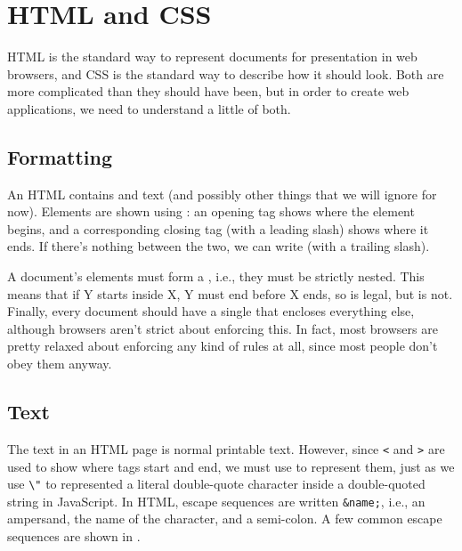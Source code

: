 \chapter{HTML and CSS}\label{s:htmlcss}

HTML is the standard way to represent documents for presentation in web browsers,
and CSS is the standard way to describe how it should look.
Both are more complicated than they should have been,
but in order to create web applications,
we need to understand a little of both.

\section{Formatting}\label{s:htmlcss-formatting}

An HTML  contains  and text
(and possibly other things that we will ignore for now).
Elements are shown using :
an opening tag \texttt{} shows where the element begins,
and a corresponding closing tag \texttt{} (with a leading slash) shows where it ends.
If there's nothing between the two, we can write \texttt{} (with a trailing slash).

A document's elements must form a ,
i.e.,
they must be strictly nested.
This means that if Y starts inside X,
Y must end before X ends,
so \texttt{} is legal,
but \texttt{} is not.
Finally,
every document should have a single  that encloses everything else,
although browsers aren't strict about enforcing this.
In fact,
most browsers are pretty relaxed about enforcing any kind of rules at all,
since most people don't obey them anyway.

\section{Text}\label{s:htmlcss-text}

The text in an HTML page is normal printable text.
However,
since \texttt{{\textless}} and \texttt{{\textgreater}} are used to show where tags start and end,
we must use  to represent them,
just as we use \texttt{\textbackslash{}"} to represented a literal double-quote character
inside a double-quoted string in JavaScript.
In HTML,
escape sequences are written \texttt{\&name;},
i.e.,
an ampersand, the name of the character, and a semi-colon.
A few common escape sequences are shown in .

